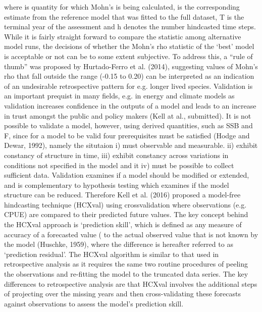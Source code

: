 where  is quantity for which Mohn’s is being calculated,  is the corresponding estimate from the reference model that was fitted to the full dataset, T is the terminal year of the assessment and h denotes the number hindcasted time steps. While it is fairly straight forward to compare the  statistic among alternative model runs, the decisions of whether the Mohn’s rho statistic of the ‘best’ model is acceptable or not can be to some extent subjective. To address this, a “rule of thumb” was proposed by Hurtado-Ferro et al. (2014), suggesting values of Mohn’s rho that fall outside the range (-0.15 to 0.20) can be interpreted as an indication of an undesirable retrospective pattern for e.g. longer lived species.
Validation is an important prequist in many fields, e.g. in energy and climate models as validation increases confidence in the outputs of a model and leads to an increase in trust amongst the public and policy makers (Kell at al., submitted). It is not possible to validate a model, however, using derived quantities, such as SSB and F, since for a model to be valid four prerequisites must be satisfied (Hodge and Dewar, 1992), namely the situtaion i) must observable and measurable. ii) exhibit constancy of structure in time, iii) exhibit constancy across variations in conditions not specified in the model and it iv) must be possible to collect sufficient data. Validation examines if a model should be modified or extended, and is complementary to hypothesis testing which examines if the model structure can be reduced. Therefore Kell et al. (2016) proposed a model-free hindcasting technique (HCXval) using crossvalidation where observations (e.g. CPUE) are compared to their predicted future values. The key concept behind the HCXval approach is ‘prediction skill’, which is defined as any measure of accuracy of a forecasted value ( to the actual observed value that is  not known by the model (Huschke, 1959), where the difference  is hereafter referred to as ‘prediction residual’. The HCXval algorithm is similar to that used in retrospective analysis as it requires the same two routine procedures of peeling the observations and re-fitting the model to the truncated data series. The key differences to retrospective analysis are that HCXval involves the additional steps of projecting over the missing years and then cross-validating these forecasts against observations to assess the model’s prediction skill.
